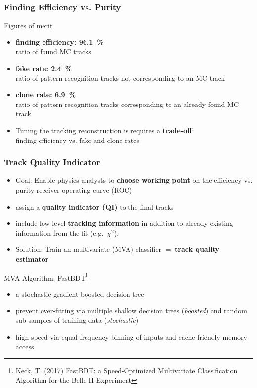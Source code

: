 \documentclass[18pt, aspectratio=169]{beamer}
\newcommand{\kitemph}[1]{\textcolor{kit-green100}{\bf{#1}}}
\begin{document}
\begin{frame}
  \frametitle{Finding Efficiency vs. Purity}
  \begin{block}{Figures of merit}
    \begin{itemize}
    \item \textbf{finding efficiency: \SI{96.1}{\percent}}\\
      ratio of found MC tracks
    \item \textbf{fake rate: \SI{2.4}{\percent}}\\
      ratio of pattern recognition tracks not corresponding to an MC track
    \item \textbf{clone rate: \SI{6.9}{\percent}}\\
        ratio of pattern recognition tracks corresponding to an already found MC track
    \end{itemize}
  \end{block}
  \begin{itemize}
  \item Tuning the tracking reconstruction is requires a \kitemph{trade-off}:\\
    finding efficiency vs. fake and clone rates
  \end{itemize}
\end{frame}
\begin{frame}
  \frametitle{Track Quality Indicator}
  \begin{itemize}
  \item Goal: Enable physics analysts to \kitemph{choose working point} on the efficiency vs.
    purity receiver operating curve (ROC)
  \item assign a \kitemph{quality indicator (QI)} to the final tracks
  \item include low-level \kitemph{tracking information} in addition to already existing information from the fit (e.g.\ $\chi^2$), 
  \item Solution: Train an multivariate (MVA) classifier $=$ \kitemph{track quality estimator}
  \end{itemize}
    \begin{block}{MVA Algorithm: FastBDT\footnote[frame]{Keck, T. (2017) FastBDT: a Speed-Optimized
        Multivariate Classification Algorithm for the Belle II Experiment}}
    \begin{itemize}
    \item a stochastic gradient-boosted decision tree
    \item prevent over-fitting via multiple shallow decision trees (\emph{boosted}) and random sub-samples of training data
      (\emph{stochastic})
    \item high speed via equal-frequency binning of inputs and cache-friendly memory access
    \end{itemize}
  \end{block}
\end{frame}
\end{document}
